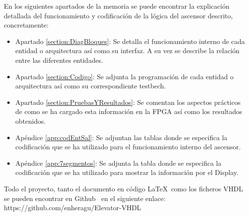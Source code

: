     En los siguientes apartados de la memoria se puede encontrar la explicación detallada del funcionamiento y codificación de la lógica del ascensor descrito, concretamente:
    \begin{itemize}
        \item Apartado \ref{section:DiagBloques}: Se detalla el funcionamiento interno de cada entidad o arquitectura así como su interfaz. A su vez se describe la relación entre las diferentes entidades.
        \item Apartado \ref{section:Codigo}: Se adjunta la programación de cada entidad o arquitectura así como su correspondiente testbech.
        \item Apartado \ref{section:PruebasYResultados}: Se comentan los aspectos prácticos de como se ha cargado esta información en la FPGA así como los resultados obtenidos.
        \item Apéndice \ref{app:codEntSal}: Se adjuntan las tablas donde se especifica la codificación que se ha utilizado para el funcionamiento interno del ascensor.
	\item Apéndice \ref{app:7segmentos}: Se adjunta la tabla donde se especifica la codificación que se ha utilizado para mostrar la información por el Display.
    \end{itemize}
    
    Todo el proyecto, tanto el documento en código \LaTeX\  como los ficheros VHDL se pueden encontrar en Github \faGithub\ en el siguiente enlace: https://github.com/enheragu/Elevator-VHDL
